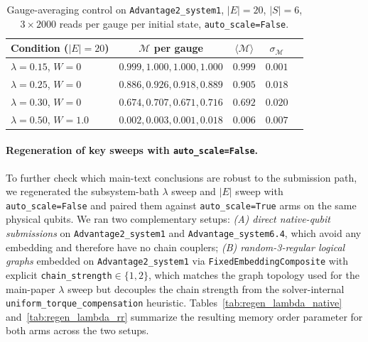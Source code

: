 \documentclass[aps,prapplied,reprint,superscriptaddress,floatfix,nofootinbib]{revtex4-2}
\begin{document}
\begin{table}[!htbp]
\centering
\caption{Gauge-averaging control on \texttt{Advantage2\_system1}, $|E|=20$, $|S|=6$, $3\times 2000$ reads per gauge per initial state, \texttt{auto\_scale=False}.}
\label{tab:gauge_average}
\small
\begin{tabular}{lcccc}
\toprule
Condition ($|E|=20$) & $\mathcal{M}$ per gauge & $\langle\mathcal{M}\rangle$ & $\sigma_\mathcal{M}$ \\
\midrule
$\lambda=0.15$, $W=0$    & $0.999, 1.000, 1.000, 1.000$ & $0.999$ & $0.001$ \\
$\lambda=0.25$, $W=0$    & $0.886, 0.926, 0.918, 0.889$ & $0.905$ & $0.018$ \\
$\lambda=0.30$, $W=0$    & $0.674, 0.707, 0.671, 0.716$ & $0.692$ & $0.020$ \\
$\lambda=0.50$, $W=1.0$  & $0.002, 0.003, 0.001, 0.018$ & $0.006$ & $0.007$ \\
\bottomrule
\end{tabular}
\end{table}

\paragraph{Regeneration of key sweeps with \texttt{auto\_scale=False}.}
To further check which main-text conclusions are robust to the submission path, we regenerated the subsystem-bath $\lambda$ sweep and $|E|$ sweep with \texttt{auto\_scale=False} and paired them against \texttt{auto\_scale=True} arms on the same physical qubits.
We ran two complementary setups:
\emph{(A) direct native-qubit submissions} on \texttt{Advantage2\_system1} and \texttt{Advantage\_system6.4}, which avoid any embedding and therefore have no chain couplers;
\emph{(B) random-3-regular logical graphs} embedded on \texttt{Advantage2\_system1} via \texttt{FixedEmbeddingComposite} with explicit \texttt{chain\_strength}$\in\{1,2\}$, which matches the graph topology used for the main-paper $\lambda$ sweep but decouples the chain strength from the solver-internal \texttt{uniform\_torque\_compensation} heuristic.
Tables~\ref{tab:regen_lambda_native} and~\ref{tab:regen_lambda_rr} summarize the resulting memory order parameter for both arms across the two setups.
\end{document}
